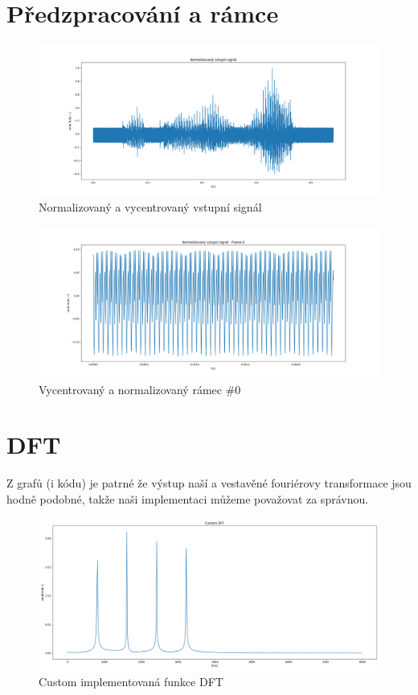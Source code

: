 \documentclass{article}
\begin{document}
\section{Předzpracování a rámce}
\begin{figure}[H] 
	\centering
	\includegraphics[scale=0.35,keepaspectratio]{Figure_3}
	\caption{Normalizovaný a vycentrovaný vstupní signál}
\end{figure}

\begin{figure}[H] 
	\centering
	\includegraphics[scale=0.35,keepaspectratio]{Figure_2}
	\caption{Vycentrovaný a normalizovaný rámec \#0}
\end{figure}

\section{DFT}

Z grafů (i kódu) je patrné že výstup naší a vestavěné fouriérovy transformace jsou hodně podobné, takže naši implementaci můžeme považovat za správnou.

\begin{landscape}
\begin{figure}[H]
	\centering
	\includegraphics[scale=0.5,keepaspectratio]{Figure_5}
	\caption{Custom implementovaná funkce DFT}
\end{figure}
\end{landscape}
\end{document}

